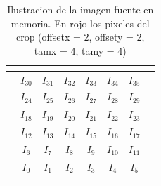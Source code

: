\begin{table}[h]
\centering
\mem
\begin{tabular}{l|c|c|c|c|c|c|l}
 & \multicolumn{1}{l|}{}      & \multicolumn{1}{l|}{}       & \multicolumn{1}{l|}{}       & \multicolumn{1}{l|}{}       & \multicolumn{1}{l|}{}       & \multicolumn{1}{l|}{}      &  \\ \hline
 & \cellcolor[HTML]{FFCB2F}$I_{30}$ & \cellcolor[HTML]{FFCB2F}$I_{31}$  & \cellcolor[HTML]{FD6864}$I_{32}$  & \cellcolor[HTML]{FD6864}$I_{33}$  & \cellcolor[HTML]{FD6864}$I_{34}$  & \cellcolor[HTML]{FD6864}$I_{35}$ &  \\ \hline
 & \cellcolor[HTML]{FFCB2F}$I_{24}$ & \cellcolor[HTML]{FFCB2F}$I_{25}$  & \cellcolor[HTML]{FD6864}$I_{26}$  & \cellcolor[HTML]{FD6864}$I_{27}$  & \cellcolor[HTML]{FD6864}$I_{28}$  & \cellcolor[HTML]{FD6864}$I_{29}$ &  \\ \hline
 & \cellcolor[HTML]{FFCB2F}$I_{18}$ & \cellcolor[HTML]{FFCB2F}$I_{19}$ & \cellcolor[HTML]{FD6864}$I_{20}$ & \cellcolor[HTML]{FD6864}$I_{21}$ & \cellcolor[HTML]{FD6864}$I_{22}$  & \cellcolor[HTML]{FD6864}$I_{23}$ &  \\ \hline
 & \cellcolor[HTML]{FFCB2F}$I_{12}$ & \cellcolor[HTML]{FFCB2F}$I_{13}$ & \cellcolor[HTML]{FD6864}$I_{14}$ & \cellcolor[HTML]{FD6864}$I_{15}$ & \cellcolor[HTML]{FD6864}$I_{16}$  & \cellcolor[HTML]{FD6864}$I_{17}$ &  \\ \hline
 & \cellcolor[HTML]{FFCB2F}$I_{6}$ & \cellcolor[HTML]{FFCB2F}$I_{7}$ & \cellcolor[HTML]{FFCB2F}$I_{8}$ & \cellcolor[HTML]{FFCB2F}$I_{9}$ & \cellcolor[HTML]{FFCB2F}$I_{10}$  & \cellcolor[HTML]{FFCB2F}$I_{11}$ &  \\ \hline
 & \cellcolor[HTML]{FFCB2F}$I_{0}$ & \cellcolor[HTML]{FFCB2F}$I_{1}$ & \cellcolor[HTML]{FFCB2F}$I_{2}$ & \cellcolor[HTML]{FFCB2F}$I_{3}$ & \cellcolor[HTML]{FFCB2F}$I_{4}$  & \cellcolor[HTML]{FFCB2F}$I_{5}$ &  \\ \hline
 & \multicolumn{1}{l|}{}      & \multicolumn{1}{l|}{}       & \multicolumn{1}{l|}{}       & \multicolumn{1}{l|}{}       & \multicolumn{1}{l|}{}       & \multicolumn{1}{l|}{}      &
\end{tabular}
\caption{Ilustracion de la imagen fuente en memoria. En rojo los pixeles del crop \newline
(offsetx = 2, offsety = 2, tamx = 4, tamy = 4)}
\end{table}

